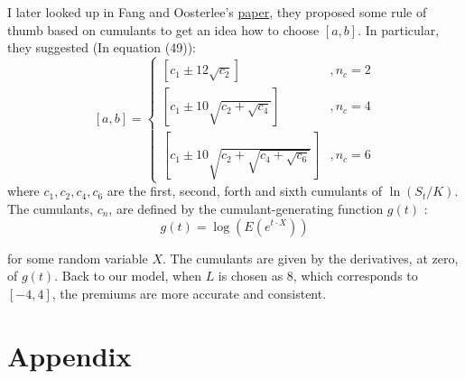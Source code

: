 \documentclass[letterpaper]{article}
\begin{document}
 I later looked up in Fang and Oosterlee's \href{http://ta.twi.tudelft.nl/mf/users/oosterle/oosterlee/COS.pdf}{paper}, they proposed some rule of thumb based on cumulants to get an idea how to choose $[a, b]$. In particular, they suggested (In equation (49)):
$$
[a, b]= \begin{cases}{\left[c_1 \pm 12 \sqrt{c_2}\right]} & , n_c=2 \\ {\left[c_1 \pm 10 \sqrt{c_2+\sqrt{c_4}}\right]} & , n_c=4 \\ {\left[c_1 \pm 10 \sqrt{c_2+\sqrt{c_4+\sqrt{c_6}}}\right]} & , n_c=6\end{cases}
$$
where $c_1, c_2, c_4, c_6$ are the first, second, forth and sixth cumulants of $\ln \left(S_t / K\right)$. The cumulants, $c_n$, are defined by the cumulant-generating function $g(t)$ :
$$
g(t)=\log \left(E\left(e^{t \cdot X}\right)\right)
$$

for some random variable $X$. The cumulants are given by the derivatives, at zero, of $g(t)$. Back to our model, when $L$ is chosen as 8, which corresponds to $[-4,4]$, the premiums are more accurate and consistent.


	\clearpage
	
\section{Appendix}
\end{document}

